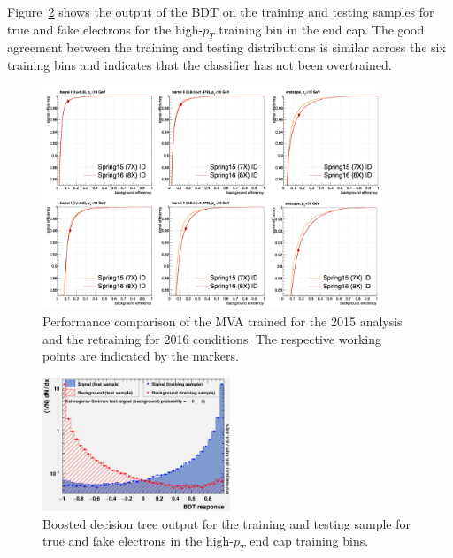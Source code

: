Figure~\ref{fig:ele_ID_BDT_output} shows the output of the BDT on the training and testing samples for true and fake electrons 
for the high-$p_T$ training bin in the end cap. 
The good agreement between the training and testing distributions is similar across the six training bins and indicates that the classifier has not been overtrained.

\begin{figure}[!htb]
\vspace*{0.3cm}
\begin{center}
\includegraphics[width=0.9\textwidth]{Figures/Electrons/ele_ROC.png}
\caption{Performance comparison of the MVA trained for the 2015 analysis and the retraining for 2016 conditions. 
The respective working points are indicated by the markers.
\label{fig:ele_ID_ROC}}
\end{center}
\end{figure}

\begin{figure}[!htb]
\vspace*{0.3cm}
\begin{center}
\includegraphics[width=0.5\textwidth]{Figures/Electrons/ele_overtraining.png}
\caption{Boosted decision tree output for the training and testing sample for true and fake electrons in the high-$p_T$ end cap training bins.
\label{fig:ele_ID_BDT_output}}
\end{center}
\end{figure}

